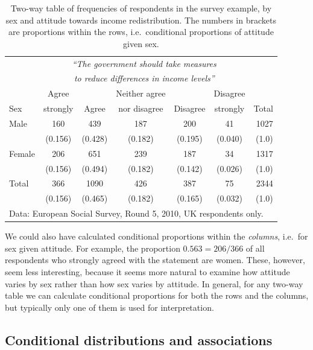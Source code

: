 \begin{table}
\caption{Two-way table of frequencies of respondents in the survey example,
by sex and attitude towards income redistribution. The numbers in
brackets are proportions within the rows, i.e.\ conditional proportions
of attitude given sex.}
\label{t_sex_attitude_row}
\begin{center}
\begin{tabular}{|l|ccccc|r|}\hline
& \multicolumn{5}{|c|}{\emph{``The government should
take measures}} & \\
& \multicolumn{5}{|c|}{\emph{to reduce differences in income levels''}}
& \\
 & Agree & & Neither agree & & Disagree & \\
Sex & strongly & Agree & nor disagree & Disagree & strongly & Total \\ \hline
Male &  160& 439 & 187 &200  & 41 & 1027 \\
& (0.156) & (0.428) & (0.182) & (0.195) & (0.040) & (1.0) \\
Female & 206 & 651 & 239 & 187 & 34 & 1317\\
& (0.156) & (0.494) & (0.182) & (0.142) & (0.026) & (1.0) \\
\hline
Total & 366 & 1090 & 426 & 387 & 75 & 2344 \\
 & (0.156) & (0.465) & (0.182) & (0.165)& (0.032) & (1.0) \\
\hline
\multicolumn{7}{l}{\scriptsize Data: European Social Survey, Round 5,
2010, UK respondents only.}
\end{tabular}
\end{center}

\end{table}

We could also have calculated conditional proportions within the
\emph{columns}, i.e.\ for sex given attitude. For example, the
proportion $0.563=206/366$ of all respondents who strongly agreed with
the statement are women. These, however, seem less interesting, because
it seems more natural to examine
how attitude varies by sex rather than how sex varies by attitude. In
general, for any two-way table we can calculate conditional proportions
for both the rows and the columns, but typically only one of them is
used for interpretation.

\subsection{Conditional distributions and associations}
\label{ss_descr1_2cat_assoc}

